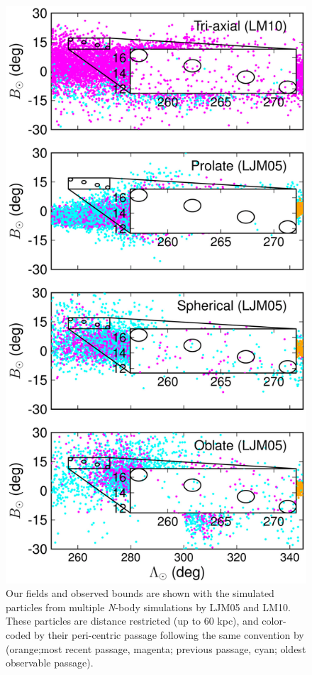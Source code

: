 \documentclass[preprint2]{aastex}
\begin{document}
	\begin{figure}[t!]
		\includegraphics[width=\columnwidth]{./sgr_spatial.eps}
		\caption{Our fields and observed bounds are shown with the simulated particles from multiple \textit{N}-body simulations by LJM05 and LM10. These particles are distance restricted (up to 60 kpc), and color-coded by their peri-centric passage following the same convention by \citet{Law;Majewski_2010} (orange;most recent passage, magenta; previous passage, cyan; oldest observable passage).}
		\label{fig:law-spatial}
	\end{figure}
\end{document}
